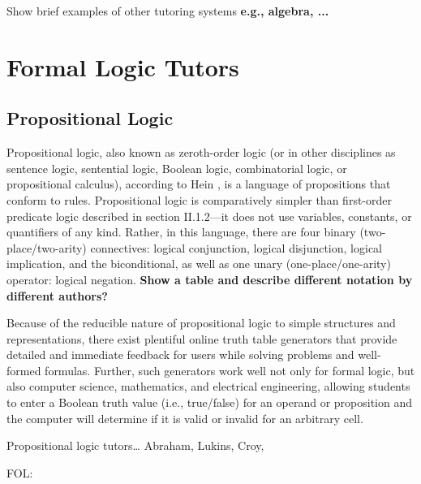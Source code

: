 \documentclass[ms]{uncgdissertationexp2}
\theoremstyle{plain}
\theoremstyle{definition}
\theoremstyle{remark}
\begin{document}
Show brief examples of other tutoring systems \textbf{e.g., algebra, ...}
\section{Formal Logic Tutors}
\subsection{Propositional Logic}
Propositional logic, also known as zeroth-order logic (or in other disciplines as sentence logic, sentential logic, Boolean logic, combinatorial logic, or propositional calculus), according to Hein \cite{heinbook}, is a language of propositions that conform to rules. Propositional logic is comparatively simpler than first-order predicate logic described in section II.1.2---it does not use variables, constants, or quantifiers of any kind. Rather, in this language, there are four binary (two-place/two-arity) connectives: logical conjunction, logical disjunction, logical implication, and the biconditional, as well as one unary (one-place/one-arity) operator: logical negation. \textbf{Show a table and describe different notation by different authors?}
        
Because of the reducible nature of propositional logic to simple structures and representations, there exist plentiful online truth table generators that provide detailed and immediate feedback for users while solving problems and well-formed formulas. Further, such generators work well not only for formal logic, but also computer science, mathematics, and electrical engineering, allowing students to enter a Boolean truth value (i.e., true/false) for an operand or proposition and the computer will determine if it is valid or invalid for an arbitrary cell. 

Propositional logic tutors… Abraham, Lukins, Croy,

FOL: 
\end{document}
